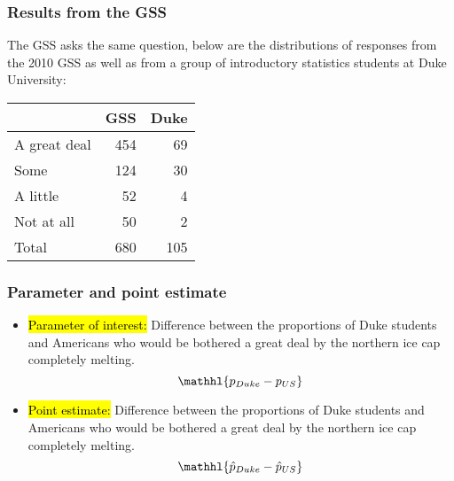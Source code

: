 \documentclass[slidestop,compress,mathserif]{beamer}
\begin{document}

\begin{frame}
\frametitle{Results from the GSS}

The GSS asks the same question, below are the distributions of responses from the 2010 GSS as well as from a group of introductory statistics students at Duke University: \\

\begin{center}
\begin{tabular}{l r r}
\hline
				& GSS	& Duke \\
\hline
A great deal		& 454	& 69 \\
Some			& 124 	& 30\\
A little			& 52 		& 4\\
Not at all			& 50 		& 2 \\
\hline
Total				& 680 	& 105\\
\hline
\end{tabular}
\end{center}

\end{frame}


\begin{frame}
\frametitle{Parameter and point estimate}

\begin{itemize}

\item \hl{Parameter of interest:} Difference between the proportions of  Duke students and  Americans who would be bothered a great deal by the northern ice cap completely melting.
\[ \mathhl{ p_{Duke} - p_{US} }\]

\pause

\item \hl{Point estimate:} Difference between the proportions of  Duke students and  Americans who would be bothered a great deal by the northern ice cap completely melting.
\[ \mathhl{ \hat{p}_{Duke} - \hat{p}_{US} }\]

\end{itemize}

\end{frame}

\end{document}
